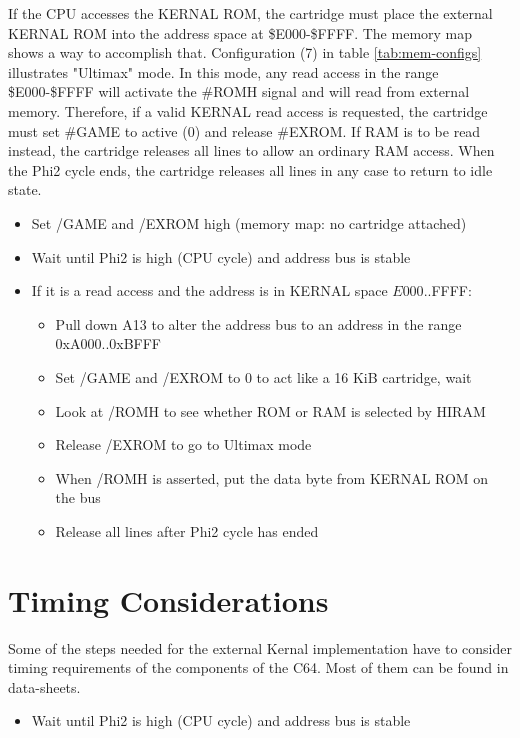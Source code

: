 \documentclass[a4paper,oneside]{memoir}
\begin{document}
If the CPU accesses the KERNAL ROM, the cartridge must place the external KERNAL ROM into the address space at \$E000-\$FFFF.
The memory map shows a way to accomplish that.
Configuration (7) in table \ref {tab:mem-configs} illustrates "Ultimax" mode.
In this mode, any read access in the range \$E000-\$FFFF will activate the \#ROMH signal and will read from external memory.
Therefore, if a valid KERNAL read access is requested, the cartridge must set \#GAME to active (0) and release \#EXROM.
If RAM is to be read instead, the cartridge releases all lines to allow an ordinary RAM access.
When the Phi2 cycle ends, the cartridge releases all lines in any case to return to idle state.

\begin{itemize}
\item Set /GAME and /EXROM high (memory map: no cartridge attached)
\item Wait until Phi2 is high (CPU cycle) and address bus is stable
\item If it is a read access and the address is in KERNAL space $E000..$FFFF:
    \begin{itemize}
    \item Pull down A13 to alter the address bus to an address in the range 0xA000..0xBFFF
    \item Set /GAME and /EXROM to 0 to act like a 16 KiB cartridge, wait
    \item Look at /ROMH to see whether ROM or RAM is selected by HIRAM
    \item Release /EXROM to go to Ultimax mode
    \item When /ROMH is asserted, put the data byte from KERNAL ROM on the bus
    \item Release all lines after Phi2 cycle has ended
    \end{itemize}
\end{itemize}

\section{Timing Considerations}

Some of the steps needed for the external Kernal implementation have
to consider timing requirements of the components of the C64. Most
of them can be found in data-sheets.

\begin{itemize}
\item Wait until Phi2 is high (CPU cycle) and address bus is stable
\end{itemize}
\end{document}
